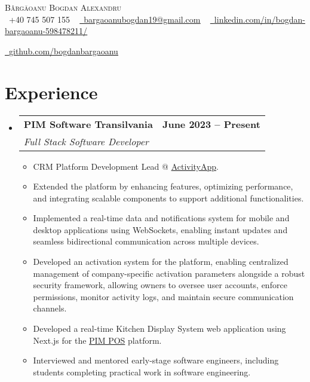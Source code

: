 \documentclass[letterpaper,11pt]{article}
\makeatletter
\newcommand{\resumeItem}[1]{
  \item\small{
    {#1 \vspace{-2pt}}
  }
}
\newcommand{\resumeSubheading}[4]{
  \vspace{-2pt}\item
    \begin{tabular*}{1.0\textwidth}[t]{l@{\extracolsep{\fill}}r}
      \textbf{#1} & \textbf{\small #2} \\
      \textit{\small#3} & \textit{\small #4} \\
    \end{tabular*}\vspace{-7pt}
}
\newcommand{\resumeSubHeadingListStart}{\begin{itemize}[leftmargin=0.0in, label={}]}
\newcommand{\resumeSubHeadingListEnd}{\end{itemize}}
\newcommand{\resumeItemListStart}{\begin{itemize}}
\newcommand{\resumeItemListEnd}{\end{itemize}\vspace{-5pt}}
\makeatother
\begin{document}
\begin{center}
    {\Huge \scshape Bârgăoanu Bogdan Alexandru} \\ \vspace{1pt}
    \small \raisebox{-0.1\height}\faPhone\ +40 745 507 155 ~ 
    \href{mailto:bargaoanubogdan19@gmail.com}{\raisebox{-0.2\height}\faEnvelope\  \underline{bargaoanubogdan19@gmail.com}} ~ 
    \href{https://linkedin.com/in//}{\raisebox{-0.2\height}\faLinkedin\ \underline{linkedin.com/in/bogdan-bargaoanu-598478211/}}  ~
    
    \href{https://github.com/bogdanbargaoanu}{\raisebox{-0.2\height}\faGithub\ \underline{github.com/bogdanbargaoanu}}
    \vspace{-8pt}
\end{center}
\section{Experience}
  \resumeSubHeadingListStart
   \resumeSubheading
      {PIM Software Transilvania}{June 2023 -- Present}
      {Full Stack Software Developer}{}
      \resumeItemListStart
        \resumeItem{CRM Platform Development Lead @ \href{https://pimsoftware.ro/activityapp/}{ActivityApp}.}
        \resumeItem{Extended the platform by enhancing features, optimizing performance, and integrating scalable components to support additional functionalities.}
        \resumeItem{ Implemented a real-time data and notifications system for mobile and desktop applications using WebSockets, enabling instant updates and seamless bidirectional communication across multiple devices.}
        \resumeItem{ Developed an activation system for the platform, enabling centralized management of company-specific activation parameters alongside a robust security framework, allowing owners to oversee user accounts, enforce permissions, monitor activity logs, and maintain secure communication channels.}
        \resumeItem{ Developed a real-time Kitchen Display System web application using Next.js for the \href{https://pimsoftware.ro/pim-pos/}{PIM POS} platform.}
        \resumeItem{Interviewed and mentored early-stage software engineers, including students completing practical work in software engineering.}
      \resumeItemListEnd
  \resumeSubHeadingListEnd
\vspace{-16pt}

\end{document}
